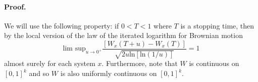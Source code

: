 \documentclass[11pt,english]{article}
\begin{document}
\paragraph*{Proof.}

We will use the following property: if $0<T<1$ where $T$ is a stopping
time, then by the local version of the law of the iterated logarithm
for Brownian motion 
\begin{equation}
\mbox{lim sup}_{u\rightarrow0^{+}}\frac{\left[W_{x}\left(T+u\right)-W_{x}\left(T\right)\right]}{\sqrt{2u\mbox{ln}\left[\mbox{ln}\left(1/u\right)\right]}}=1\label{eq:1.1}
\end{equation}
almost surely for each system $x$. Furthermore, note that $W$ is
continuous on $\left[0,1\right]^{k}$ and so $W$ is also uniformly
continuous on $\left[0,1\right]^{k}$.
\end{document}
